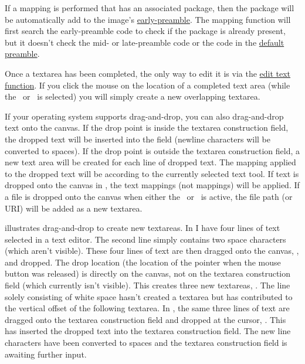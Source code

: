 If a mapping is performed that has an associated package, then the
package will be automatically add to the image's
\hyperref[sec:preamble]{early-preamble}. The mapping function will
first search the early-preamble code to check if the package is
already present, but it doesn't check the mid- or late-preamble code
or the code in the \hyperref[sec:texconfigpreamble]{default
preamble}.

Once a \gls{textarea} has been completed, the only way to edit it is via the
\hyperref[sec:edittext]{edit text function}. If you click the
mouse on the location of a completed text area (while the
\texttool\ or \mathstool\ is selected) you will simply create a new
overlapping \gls*{textarea}.

If your operating system supports \gls{drag-and-drop}, you can also
\gls{drag-and-drop} text onto the \gls{canvas}. If the drop point is
inside the \gls{textarea} construction field, the dropped text will
be inserted into the field (newline characters will be converted to
spaces). If the drop point is outside the \gls{textarea}
construction field, a new text area will be created for each line of
dropped text. The mapping applied to the dropped text will be
according to the currently selected text tool.  If text is dropped
onto the \gls{canvas} in \selectmode, the text mappings (not
 mappings) will be applied. If a file is dropped onto
the \gls{canvas} when either the \texttool\ or \mathstool\ is
active, the file path (or URI) will be added as a new
\gls{textarea}.

 illustrates \gls{drag-and-drop} to create new
\glspl{textarea}.
In  I have four lines of
text selected in a text editor. The second line simply contains two
space characters (which aren't visible). These four lines of text
are then dragged onto the \gls{canvas},
, and dropped. The drop location (the
location of the pointer when the mouse button was released) is
directly on the canvas, not on the \gls{textarea} construction field (which
currently isn't visible). This creates three new \glspl*{textarea},
.
The line solely consisting of white space hasn't created a 
\gls{textarea} but has contributed to the vertical offset of the following
\gls{textarea}. In , the same three lines of
text are dragged onto the \gls{textarea} construction field and dropped
at the cursor, . This has inserted the
dropped text into the \gls{textarea} construction field. The new line
characters have been converted to spaces and the \gls{textarea}
construction field is awaiting further input.

